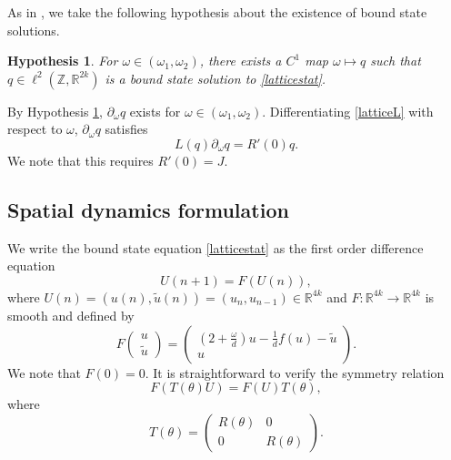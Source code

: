 \documentclass[12pt]{article}
\def\R{{\mathbb R}}
\def\Z{{\mathbb Z}}
\newtheorem{hypothesis}{Hypothesis}
\begin{document}
\noindent As in \cite{Grillakis1987}, we take the following hypothesis about the existence of bound state solutions.
\begin{hypothesis}\label{boundstatehyp}
For $\omega \in (\omega_1, \omega_2)$, there exists a $C^1$ map $\omega \mapsto q$ such that $q \in \ell^2(\Z, \R^{2k})$ is a bound state solution to \eqref{latticestat}.
\end{hypothesis}

By Hypothesis \ref{boundstatehyp}, $\partial_\omega q$ exists for $\omega \in (\omega_1, \omega_2)$. Differentiating \eqref{latticeL} with respect to $\omega$, $\partial_\omega q$ satisfies 
\begin{equation}\label{Lkernel2}
L(q)\partial_\omega q = R'(0) q.
\end{equation}
We note that this requires $R'(0) = J$.

\subsection{Spatial dynamics formulation}

We write the bound state equation \eqref{latticestat} as the first order difference equation
\begin{equation}\label{diffeq}
U(n+1) = F(U(n)),
\end{equation}
where $U(n) = (u(n), \tilde{u}(n)) = (u_n, u_{n-1}) \in \R^{4k}$ and $F: \R^{4k}\rightarrow \R^{4k}$ is smooth and defined by
\begin{equation}\label{latticeF}
F\begin{pmatrix}u \\ \tilde{u} \end{pmatrix} =
\begin{pmatrix}
\left( 2 + \frac{\omega}{d} \right)u - \frac{1}{d}f(u) - \tilde{u} \\
u
\end{pmatrix}.
\end{equation}
We note that $F(0) = 0$. It is straightforward to verify the symmetry relation 
\begin{equation}
F(T(\theta)U) = F(U)T(\theta),
\end{equation}
where
\begin{equation}
T(\theta) = \begin{pmatrix}
R(\theta) & 0 \\ 0 & R(\theta)
\end{pmatrix}.
\end{equation}
\end{document}
